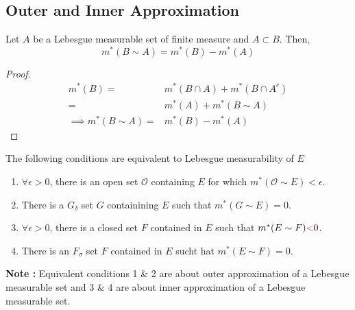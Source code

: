 \subsection{Outer and Inner Approximation}
\begin{definition}
Let $A$ be a Lebesgue measurable set of finite measure and $A \subset B$.
	Then,
\begin{equation}
	m^\ast(B \sim A) = m^\ast(B) - m^\ast(A)
\end{equation}
\begin{proof}
\begin{align*}
	m^\ast(B) = & m^\ast(B \cap A) + m^\ast(B \cap A^c) \\
	= & m^\ast(A) + m^\ast(B \sim A) \\
	\implies m^\ast(B \sim A) = & m^\ast(B) - m^\ast(A)
\end{align*}
\end{proof}
\end{definition}

\begin{theorem}[approximation]
	The following conditions are equivalent to Lebesgue measurability of $E$
\begin{enumerate}
	\item $\forall \epsilon > 0$, there is an open set $\mathcal{O}$ containing $E$ for which $m^\ast(\mathcal{O}\sim E) < \epsilon$.
	\item There is a $G_\delta$ set $G$ containining $E$ such that $m^\ast(G \sim E) = 0$.
	\item $\forall \epsilon > 0$, there is a closed set $F$ contained in $E$ such that $m^\ast(E\sim F) {\color{red}<} 0$.
	\item There is an $F_\sigma$ set $F$ contained in $E$ sucht hat $m^\ast(E \sim F) = 0$.
\end{enumerate}
\end{theorem}

\textbf{Note :} Equivalent conditions 1 \& 2 are about outer approximation of a Lebesgue measurable set and 3 \& 4 are about inner approximation of a Lebesgue measurable set.\\

